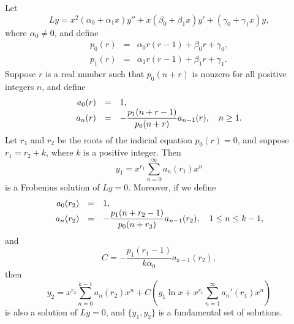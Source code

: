 \begin{theorem}
  \color{blue}
  \label{thmtype:7.7.1} Let
  \[
    Ly= x^{2}(\alpha_{0}+\alpha_{1}x)y''+x(\beta_{0}+\beta_{1}x)y' +(\gamma_{0}+\gamma_{1}x)y,
  \]
  where $\alpha_{0}\ne0$, and define
  \begin{eqnarray*}
    p_{0}(r) & = & \alpha_{0}r(r-1)+\beta_{0}r+\gamma_{0}, \\[5pt]
    p_{1}(r) & = & \alpha_{1}r(r-1)+\beta_{1}r+\gamma_{1}.
  \end{eqnarray*}
  Suppose $r$ is a real number such that $p_{0}(n+r)$ is nonzero for all positive integers $n$, and
  define
  \begin{equation}
    \label{eq:7.7.2}
    \begin{array}{rcl}
      a_{0}(r) & = & 1,                                                          \\
      a_{n}(r) & = & -\displaystyle\frac{p_{1}(n+r-1)}{p_{0}(n+r)}a_{n-1}(r),\quad n\ge1.
    \end{array}
  \end{equation}
  Let $r_{1}$ and $r_{2}$ be the roots of the indicial equation $p_{0}(r)=0$, and suppose
  $r_{1}=r_{2}+k$, where $k$ is a positive integer. Then
  \[
    y_{1}=x^{r_{1}}\sum_{n=0}^{\infty}a_{n}(r_{1})x^{n}
  \]
  is a Frobenius solution of $Ly=0$. Moreover, if we define
  \begin{equation}
    \label{eq:7.7.3}
    \begin{array}{rcl}
      a_{0}(r_{2}) & = & 1,                                                                              \\
      a_{n}(r_{2}) & = & -\displaystyle\frac{p_{1}(n+r_{2}-1)}{p_{0}(n+r_{2})}a_{n-1}(r_{2}),\quad 1\le n\le k-1,
    \end{array}
  \end{equation}
  and
  \begin{equation}
    \label{eq:7.7.4}C=-\frac{p_{1}(r_{1}-1)}{k\alpha_{0}}a_{k-1}(r_{2}),
  \end{equation}
  then
  \begin{equation}
    \label{eq:7.7.5}y_{2}=x^{r_{2}}\sum_{n=0}^{k-1}a_{n}(r_{2})x^{n}+C\left(y_{1}\ln x+x^{r_{1}}\sum_{n=1}^{\infty}a_{n}'(r_{1})x^{n}\right)
  \end{equation}
  is also a solution of $Ly=0$, and $\{y_{1},y_{2}\}$ is a fundamental set of solutions.
\end{theorem}

